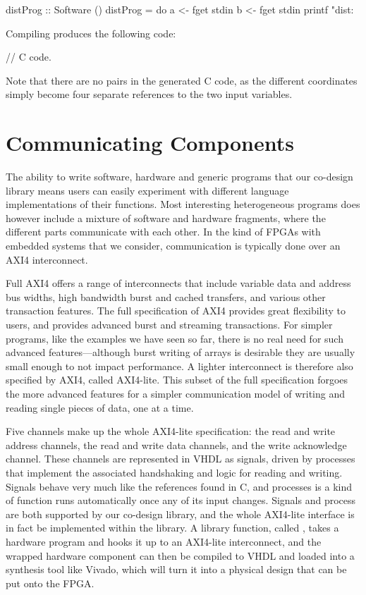 \documentclass[../main.tex]{subfiles}
\begin{document}
\begin{code}
distProg :: Software ()
distProg = do
  a <- fget stdin
  b <- fget stdin
  printf "dist: %
\end{code}

Compiling  produces the following code:

\begin{code}
// C code.
\end{code}

\noindent Note that there are no pairs in the generated C code, as the different coordinates simply become four separate references to the two input variables.

\section{Communicating Components}

The ability to write software, hardware and generic programs that our co-design library means users can easily experiment with different language implementations of their functions. Most interesting heterogeneous programs does however include a mixture of software and hardware fragments, where the different parts communicate with each other. In the kind of FPGAs with embedded systems that we consider, communication is typically done over an AXI4 interconnect.

Full AXI4 offers a range of interconnects that include variable data and address bus widths, high bandwidth burst and cached transfers, and various other transaction features. The full specification of AXI4 provides great flexibility to users, and provides advanced burst and streaming transactions. For simpler programs, like the examples we have seen so far, there is no real need for such advanced features---although burst writing of arrays is desirable they are usually small enough to not impact performance. A lighter interconnect is therefore also specified by AXI4, called AXI4-lite. This subset of the full specification forgoes the more advanced features for a simpler communication model of writing and reading single pieces of data, one at a time.

Five channels make up the whole AXI4-lite specification: the read and write address channels, the read and write data channels, and the write acknowledge channel. These channels are represented in VHDL as signals, driven by processes that implement the associated handshaking and logic for reading and writing. Signals behave very much like the references found in C, and processes is a kind of function runs automatically once any of its input changes. Signals and process are both supported by our co-design library, and the whole AXI4-lite interface is in fact be implemented within the library. A library function, called , takes a hardware program and hooks it up to an AXI4-lite interconnect, and the wrapped hardware component can then be compiled to VHDL and loaded into a synthesis tool like Vivado, which will turn it into a physical design that can be put onto the FPGA.
\end{document}
